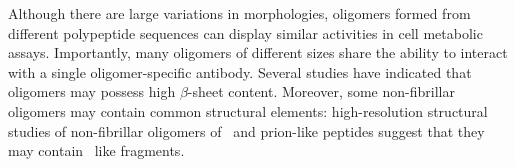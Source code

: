Although there are large variations in morphologies, oligomers formed from different polypeptide sequences can display similar activities in cell metabolic assays.\cite{Bucciantini:2002un} Importantly, many oligomers of different sizes share the ability to interact with a single oligomer-specific antibody.\cite{Kayed:2003en,Glabe:2008p130} %
Several studies have indicated that oligomers may possess high $\beta$-sheet content.\cite{Chimon:2007du,Ahmed:2010p5694,Campioni:2010hz} %
Moreover, some non-fibrillar oligomers may contain common structural elements: high-resolution structural studies of non-fibrillar oligomers of \ and prion-like peptides suggest that they may contain \crossb\ like fragments.\cite{Walsh:2010p4761,Stroud:2012dp,Chimon:2007du}
 



